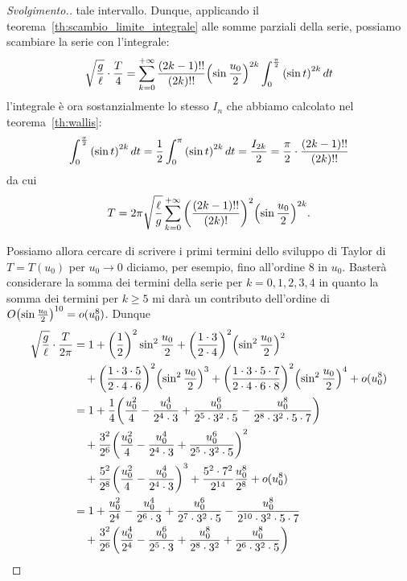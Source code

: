 \begin{proof}[Svolgimento.]
tale intervallo.
Dunque, applicando il teorema~\ref{th:scambio_limite_integrale} alle somme parziali 
della serie, 
possiamo scambiare la serie con l'integrale:
\[
\sqrt{\frac g \ell} \cdot\frac{T}{4}
= \sum_{k=0}^{+\infty}\frac{(2k-1)!!}{(2k)!!} {\left( \sin \frac{u_0}2 \right)}^{2k}
\int_0^{\frac \pi 2}  {\left( \sin t \right)}^{2k}\, dt
\]
l'integrale è ora sostanzialmente lo stesso $I_n$ che abbiamo 
calcolato nel teorema~\ref{th:wallis}:
\[
  \int_0^{\frac \pi 2} {\left( \sin t \right)}^{2k}\, dt
  = \frac 1 2 \int_0^{\pi} {\left( \sin t \right)}^{2k}\, dt
  = \frac{I_{2k}}{2}
  = \frac \pi 2 \cdot\frac{(2k-1)!!}{(2k)!!}
\]
da cui
\[
T
= 2\pi\sqrt{\frac \ell g}\sum_{k=0}^{+\infty} {\left( \frac{(2k-1)!!}{(2k)!} \right)}^2
{\left( \sin \frac{u_0} 2 \right)}^{2k}.
\]

Possiamo allora cercare di scrivere i primi termini dello sviluppo di
Taylor di $T = T(u_0)$ per $u_0\to 0$ diciamo, per esempio, fino all'ordine 8
in $u_0$. Basterà considerare la somma dei termini della
serie per $k=0,1,2,3,4$ in quanto la somma dei termini per $k\ge 5$ mi darà
 un contributo dell'ordine di $O{\left( \sin \frac {u_0} 2 \right)}^{10} = o(u_0^8)$. Dunque
 \begin{align*}
 \sqrt{\frac{g}{\ell}}\cdot \frac{T}{2\pi}
 &=
 1 + \enclose{\frac 1 2}^2 \sin^2 \frac{u_0} 2
 + \enclose{\frac{1\cdot 3}{2\cdot 4}}^2\enclose{\sin^2 \frac {u_0} 2}^2 \\
 &\quad + \enclose{\frac{1\cdot 3 \cdot 5}{2\cdot 4 \cdot 6}}^2
 \enclose{\sin^2 \frac {u_0} 2}^3 + \enclose{\frac{1\cdot 3\cdot 5 \cdot 7}{2\cdot 4\cdot 6\cdot 8}}^2
 \enclose{\sin^2 \frac {u_0} 2}^4 + o(u_0^8) \\
 &=
1 + \frac 1 4 \enclose{\frac{u_0^2}{4} - \frac{u_0^4}{2^4\cdot 3} + \frac{u_0^6}{2^5\cdot 3^2\cdot 5}
- \frac{u_0^8}{2^8\cdot 3^2\cdot 5\cdot 7}} \\
&\quad + \frac{3^2}{2^6}\enclose{\frac{u_0^2}{4} - \frac{u_0^4}{2^4\cdot 3}
+ \frac{u_0^6}{2^5\cdot 3^2\cdot 5}}^2\\
&\quad + \frac{5^2}{2^8}\enclose{\frac{u_0^2}{4} - \frac{u_0^4}{2^4\cdot 3}}^3
+ \frac{5^2\cdot 7^2}{2^{14}}
\frac {u_0^8} {2^8} + o(u_0^8)\\
&=
1 + \frac{u_0^2}{2^4} - \frac{u_0^4}{2^6\cdot 3} + \frac{u_0^6}{2^7\cdot 3^2\cdot 5}
- \frac{u_0^8}{2^{10}\cdot 3^2\cdot 5\cdot 7} \\
&\quad + \frac{3^2}{2^6}\enclose{\frac{u_0^4}{2^4} - \frac{u_0^6}{2^5\cdot 3} + \frac{u_0^8}{2^8\cdot 3^2} + \frac{u_0^8}{2^6\cdot 3^2\cdot 5}}\\

\end{align*}
\end{proof}
